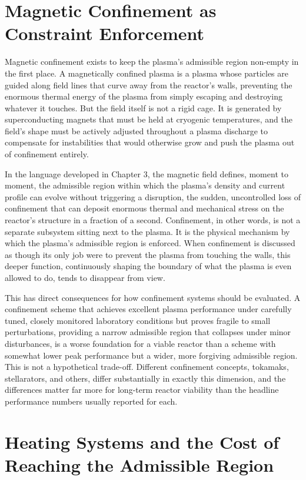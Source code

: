\section{Magnetic Confinement as Constraint Enforcement}

Magnetic confinement exists to keep the plasma's admissible region non-empty in the first place. A magnetically confined plasma is a plasma whose particles are guided along field lines that curve away from the reactor's walls, preventing the enormous thermal energy of the plasma from simply escaping and destroying whatever it touches. But the field itself is not a rigid cage. It is generated by superconducting magnets that must be held at cryogenic temperatures, and the field's shape must be actively adjusted throughout a plasma discharge to compensate for instabilities that would otherwise grow and push the plasma out of confinement entirely.

In the language developed in Chapter 3, the magnetic field defines, moment to moment, the admissible region within which the plasma's density and current profile can evolve without triggering a disruption, the sudden, uncontrolled loss of confinement that can deposit enormous thermal and mechanical stress on the reactor's structure in a fraction of a second. Confinement, in other words, is not a separate subsystem sitting next to the plasma. It is the physical mechanism by which the plasma's admissible region is enforced. When confinement is discussed as though its only job were to prevent the plasma from touching the walls, this deeper function, continuously shaping the boundary of what the plasma is even allowed to do, tends to disappear from view.

This has direct consequences for how confinement systems should be evaluated. A confinement scheme that achieves excellent plasma performance under carefully tuned, closely monitored laboratory conditions but proves fragile to small perturbations, providing a narrow admissible region that collapses under minor disturbances, is a worse foundation for a viable reactor than a scheme with somewhat lower peak performance but a wider, more forgiving admissible region. This is not a hypothetical trade-off. Different confinement concepts, tokamaks, stellarators, and others, differ substantially in exactly this dimension, and the differences matter far more for long-term reactor viability than the headline performance numbers usually reported for each.

\section{Heating Systems and the Cost of Reaching the Admissible Region}

